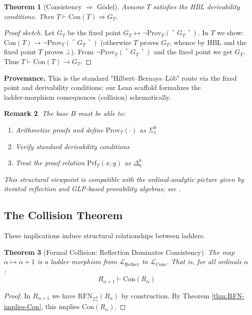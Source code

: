 \documentclass[11pt]{article}
\newtheorem{theorem}{Theorem}[section]
\newtheorem{remark}[theorem]{Remark}
\newcommand{\Con}{\mathrm{Con}}
\newcommand{\RFNSigOne}{\mathrm{RFN}_{\Sigma^0_1}}
\newcommand{\LCons}{\mathcal{L}_{\mathrm{Cons}}}
\newcommand{\LReflect}{\mathcal{L}_{\mathrm{Reflect}}}
\newcommand{\Prov}{\mathrm{Prov}}
\begin{document}
\begin{theorem}[Consistency $\Rightarrow$ Gödel]\label{thm:Con-implies-G}
Assume $T$ satisfies the HBL derivability conditions. Then
$T \vdash \Con(T) \Rightarrow G_T.$
\end{theorem}

\begin{proof}[Proof sketch]
Let $G_T$ be the fixed point $G_T \leftrightarrow \neg \Prov_T(\ulcorner G_T\urcorner)$.
In $T$ we show: $\Con(T)\to \neg \Prov_T(\ulcorner G_T\urcorner)$ (otherwise $T$ proves $G_T$,
whence by HBL and the fixed point $T$ proves $\bot$). From $\neg \Prov_T(\ulcorner G_T\urcorner)$
and the fixed point we get $G_T$. Thus $T\vdash \Con(T)\to G_T$.
\end{proof}

\begin{mdframed}[style=provenance]
\textbf{Provenance.} This is the standard "Hilbert–Bernays–Löb" route via the fixed point and derivability
conditions; our Lean scaffold formalizes the ladder‑morphism consequences (collision) schematically.
\end{mdframed}

\begin{remark}
The base $B$ must be able to:
\begin{enumerate}
\item Arithmetize proofs and define $\Prov_T(\cdot)$ as $\Sigma^0_1$
\item Verify standard derivability conditions
\item Treat the proof relation $\mathrm{Prf}_T(x,y)$ as $\Delta^0_0$
\end{enumerate}
This structural viewpoint is compatible with the ordinal-analytic picture given by iterated reflection and GLP-based provability algebras; see \cite{Beklemishev2003,Beklemishev2004,ArtemovBeklemishev2004}.
\end{remark}

\subsection{The Collision Theorem}
These implications induce structural relationships between ladders.

\begin{theorem}[Formal Collision: Reflection Dominates Consistency]
The map $\alpha \mapsto \alpha+1$ is a ladder morphism from $\LReflect$ to $\LCons$. That is, for all ordinals $\alpha$:
$$R_{\alpha+1} \vdash \Con(R_\alpha)$$
\end{theorem}
\begin{proof}
In $R_{\alpha+1}$ we have $\RFNSigOne(R_\alpha)$ by construction. By Theorem \ref{thm:RFN-implies-Con}, this implies $\Con(R_\alpha)$.
\end{proof}
\end{document}
